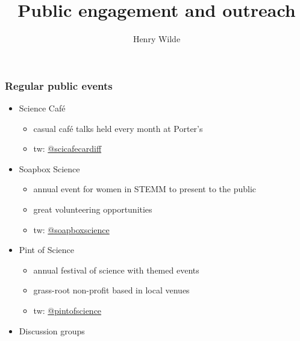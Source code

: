 \documentclass{beamer}
\title{Public engagement and outreach}
\author{Henry Wilde}
\institute{%
    \vfill%
    \centering%
    \texttt{[image: ./../edo/img/cu\_logo.png]}%
}
\date{}
\begin{document}
\begin{frame}
    \maketitle%
\end{frame}

\begin{frame}
    \frametitle{Regular public events}
    \begin{itemize}
        \item[] Science Caf\'{e}
            \begin{itemize}
                \item casual caf\'{e} talks held every month at Porter's
                \item tw: \href{https://twitter.com/SciCafeCardiff}{%
                    @scicafecardiff%
                }
            \end{itemize}
        \item[] Soapbox Science
            \begin{itemize}
                \item annual event for women in STEMM to present to the public
                \item great volunteering opportunities
                \item tw: \href{https://twitter.com/soapboxscience}{%
                    @soapboxscience%
                }
            \end{itemize}
        \item[] Pint of Science
            \begin{itemize}
                \item annual festival of science with themed events
                \item grass-root non-profit based in local venues
                \item tw: \href{https://twitter.com/pintofscience}{%
                    @pintofscience%
                }
            \end{itemize}
        \item[] Discussion groups
    \end{itemize}
\end{frame}
\end{document}
